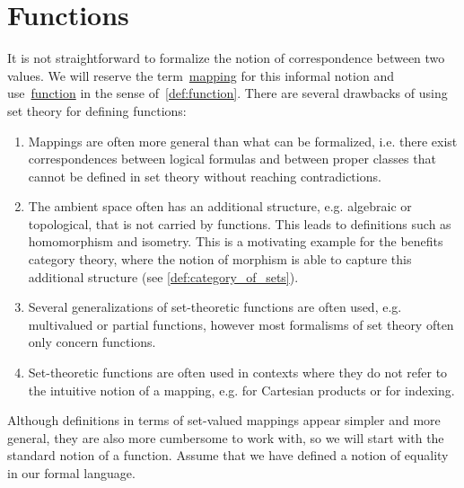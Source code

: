\section{Functions}\label{sec:functions}

It is not straightforward to formalize the notion of correspondence between two values. We will reserve the term~\ul{mapping} for this informal notion and use~\ul{function} in the sense of~\cref{def:function}. There are several drawbacks of using set theory for defining functions:
\begin{enumerate}
  \item Mappings are often more general than what can be formalized, i.e. there exist correspondences between logical formulas and between proper classes that cannot be defined in set theory without reaching contradictions.
  \item The ambient space often has an additional structure, e.g. algebraic or topological, that is not carried by functions. This leads to definitions such as homomorphism and isometry. This is a motivating example for the benefits category theory, where the notion of morphism is able to capture this additional structure (see \cref{def:category_of_sets}).
  \item Several generalizations of set-theoretic functions are often used, e.g. multivalued or partial functions, however most formalisms of set theory often only concern functions.
  \item Set-theoretic functions are often used in contexts where they do not refer to the intuitive notion of a mapping, e.g. for Cartesian products or for indexing.
\end{enumerate}

Although definitions in terms of set-valued mappings appear simpler and more general, they are also more cumbersome to work with, so we will start with the standard notion of a function. Assume that we have defined a notion of equality in our formal language.

